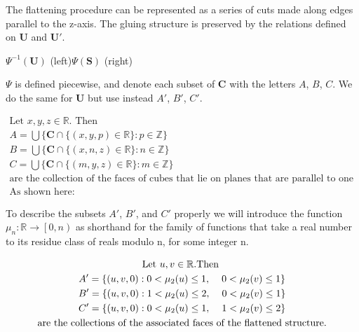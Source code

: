 \documentclass[]{article}
\begin{document}
The flattening procedure can be represented as a series of cuts made along edges parallel to the z-axis. The gluing structure is preserved by the relations defined on $\textbf{U}$ and $\textbf{U}'$. 

\begin{center}

\raisebox{0.4in}{}
 $\Psi^{-1}(\mathbf{U})$ (left)$\Psi(\mathbf{S})$ (right)
\end{center}

$\Psi$ is defined piecewise, and denote each subset of $\mathbf{C}$ with the letters $A$, $B$, $C$. We do the same for $\mathbf{U}$ but use instead $A'$, $B'$, $C'$. 

\begin{gather*}
	\text{Let }x,y,z\in\mathbb{R}. \text{ Then}
	\\A=\bigcup\big\{\mathbf{C}\cap\{(x,y,p)\in\mathbb{R}\}: p\in\mathbb{Z}\big\}
	\\B=\bigcup\big\{\mathbf{C}\cap\{(x,n,z)\in\mathbb{R}\}: n\in\mathbb{Z}\big\}
	\\C=\bigcup\big\{\mathbf{C}\cap\{(m,y,z)\in\mathbb{R}\}: m\in\mathbb{Z}\big\}
	\\\text{are the collection of the faces of cubes that lie on planes that are parallel to one another.}
	\\\text{As shown here:}
\end{gather*}



To describe the subsets $A'$, $B'$, and $C'$ properly we will introduce the function $\mu_{n}:\mathbb{R}\rightarrow \left[0,n\right) $ as shorthand for the family of functions that take a real number to its residue class of reals modulo n, for some integer n.

\begin{gather*}
	\text{Let }u,v\in\mathbb{R}. \text{Then }
	\\A'= \{(u,v,0): 0<\mu_{2}(u)\leq 1 ,\hspace{4mm} 0<\mu_{2}(v)\leq 1\}
	\\B'= \{(u,v,0): 1<\mu_{2}(u)\leq 2,\hspace{4mm} 0<\mu_{2}(v)\leq 1\}
	\\C'= \{(u,v,0): 0<\mu_{2}(u)\leq 1,\hspace{4mm} 1<\mu_{2}(v)\leq 2\}
	\\\text{are the collections of the associated faces of the flattened structure.}
\end{gather*}
\end{document}
